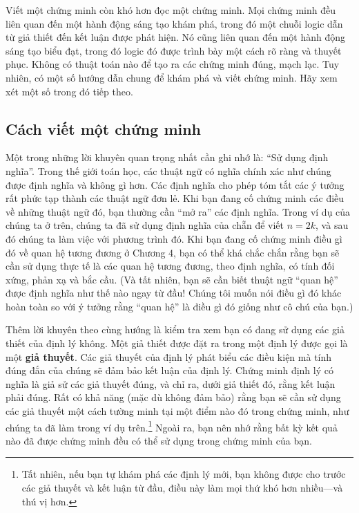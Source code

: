 Viết một chứng minh còn khó hơn đọc một chứng minh. Mọi chứng minh đều liên quan đến một hành động sáng tạo khám phá, trong đó một chuỗi logic dẫn từ giả thiết đến kết luận được phát hiện. Nó cũng liên quan đến một hành động sáng tạo biểu đạt, trong đó logic đó được trình bày một cách rõ ràng và thuyết phục. Không có thuật toán nào để tạo ra các chứng minh đúng, mạch lạc. Tuy nhiên, có một số hướng dẫn chung để khám phá và viết chứng minh. Hãy xem xét một số trong đó tiếp theo.

\subsection{Cách viết một chứng minh}

Một trong những lời khuyên quan trọng nhất cần ghi nhớ là: ``Sử dụng định nghĩa''. Trong thế giới toán học, các thuật ngữ có nghĩa chính xác như chúng được định nghĩa và không gì hơn. Các định nghĩa cho phép tóm tắt các ý tưởng rất phức tạp thành các thuật ngữ đơn lẻ. Khi bạn đang cố chứng minh các điều về những thuật ngữ đó, bạn thường cần ``mở ra'' các định nghĩa. Trong ví dụ của chúng ta ở trên, chúng ta đã sử dụng định nghĩa của chẵn để viết $n = 2k$, và sau đó chúng ta làm việc với phương trình đó. Khi bạn đang cố chứng minh điều gì đó về quan hệ tương đương ở Chương 4, bạn có thể khá chắc chắn rằng bạn sẽ cần sử dụng thực tế là các quan hệ tương đương, theo định nghĩa, có tính đối xứng, phản xạ và bắc cầu. (Và tất nhiên, bạn sẽ cần biết thuật ngữ ``quan hệ'' được định nghĩa như thế nào ngay từ đầu! Chúng tôi muốn nói điều gì đó khác hoàn toàn so với ý tưởng rằng ``quan hệ'' là điều gì đó giống như cô chú của bạn.)

Thêm lời khuyên theo cùng hướng là kiểm tra xem bạn có đang sử dụng các giả thiết của định lý không. Một giả thiết được đặt ra trong một định lý được gọi là một \textbf{giả thuyết}. Các giả thuyết của định lý phát biểu các điều kiện mà tính đúng đắn của chúng sẽ đảm bảo kết luận của định lý. Chứng minh định lý có nghĩa là giả sử các giả thuyết đúng, và chỉ ra, dưới giả thiết đó, rằng kết luận phải đúng. Rất có khả năng (mặc dù không đảm bảo) rằng bạn sẽ cần sử dụng các giả thuyết một cách tường minh tại một điểm nào đó trong chứng minh, như chúng ta đã làm trong ví dụ trên.\footnote{Tất nhiên, nếu bạn tự khám phá các định lý mới, bạn không được cho trước các giả thuyết và kết luận từ đầu, điều này làm mọi thứ khó hơn nhiều---và thú vị hơn.} Ngoài ra, bạn nên nhớ rằng bất kỳ kết quả nào đã được chứng minh đều có thể sử dụng trong chứng minh của bạn.

